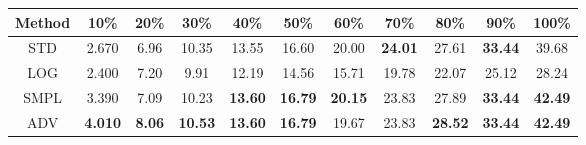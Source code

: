 \documentclass{standalone}
\begin{document}
\begin{tabular}{c|cccccccccc}
      \toprule
      Method & 10\% & 20\% & 30\% & 40\% & 50\% & 60\% & 70\% & 80\% & 90\% & 100\% \\
      \midrule
STD & 2.670 & 6.96 & 10.35 & 13.55 & 16.60 & 20.00 & \textbf{24.01} & 27.61 & \textbf{33.44} & 39.68\\
LOG & 2.400 & 7.20 & 9.91 & 12.19 & 14.56 & 15.71 & 19.78 & 22.07 & 25.12 & 28.24\\
SMPL & 3.390 & 7.09 & 10.23 & \textbf{13.60} & \textbf{16.79} & \textbf{20.15} & 23.83 & 27.89 & \textbf{33.44} & \textbf{42.49}\\
ADV & \textbf{4.010} & \textbf{8.06} & \textbf{10.53} & \textbf{13.60} & \textbf{16.79} & 19.67 & 23.83 & \textbf{28.52} & \textbf{33.44} & \textbf{42.49}\\
  \bottomrule
\end{tabular}
\end{document}
